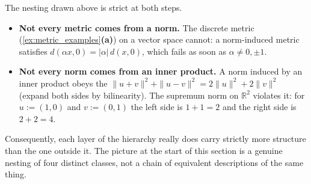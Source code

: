 \begin{remark}
\label{rem:norm_not_from_inner_product}
The nesting drawn above is strict at both steps.
\begin{itemize}
  \item \textbf{Not every metric comes from a norm.} The discrete metric
    (\cref{ex:metric_examples}\textbf{(a)}) on a vector space cannot: a norm-induced metric
    satisfies $d(\alpha x, 0) = |\alpha|\,d(x,0)$, which fails as soon as
    $\alpha \neq 0,\pm1$.
  \item \textbf{Not every norm comes from an inner product.} A norm induced by an inner product
    obeys the 
    $\|u+v\|^2 + \|u-v\|^2 = 2\|u\|^2 + 2\|v\|^2$ (expand both sides by bilinearity). The
    supremum norm on $\mathbb{R}^2$ violates it: for $u := (1,0)$ and $v := (0,1)$ the left side
    is $1+1 = 2$ and the right side is $2+2 = 4$.
\end{itemize}
Consequently, each layer of the hierarchy really does carry strictly more structure than the one
outside it. The picture at the start of this section is a genuine nesting of four distinct
classes, not a chain of equivalent descriptions of the same thing.
\end{remark}

